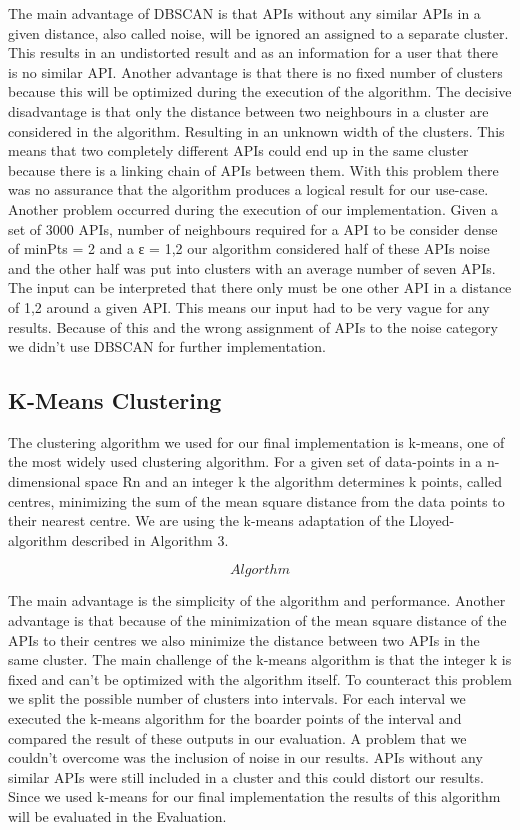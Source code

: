 \documentclass[a4paper]{IEEEtran}
\begin{document}
The main advantage of DBSCAN is that APIs without any similar APIs in a given distance, also called noise, will be ignored an assigned to a separate cluster. This results in an undistorted result and as an information for a user that there is no similar API. 
Another advantage is that there is no fixed number of clusters because this will be optimized during the execution of the algorithm.
The decisive disadvantage is that only the distance between two neighbours in a cluster are considered in the algorithm. Resulting in an unknown width of the clusters. This means that two completely different APIs could end up in the same cluster because there is a linking chain of APIs between them. With this problem there was no assurance that the algorithm produces a logical result for our use-case.
Another problem occurred during the execution of our implementation. Given a set of 3000 APIs, number of neighbours required for a API to be consider dense of minPts = 2 and a ε = 1,2 our algorithm considered half of these APIs noise and the other half was put into clusters with an average number of seven APIs. The input can be interpreted that there only must be one other API in a distance of 1,2 around a given API. This means our input had to be very vague for any results. Because of this and the wrong assignment of APIs to the noise category we didn’t use DBSCAN for further implementation.


\subsection{K-Means Clustering}
The clustering algorithm we used for our final implementation is k-means, one of the most widely used clustering algorithm. For a given set of data-points in a n-dimensional space Rn and an integer k the algorithm determines k points, called centres, minimizing the sum of the mean square distance from the data points to their nearest centre. We are using the k-means adaptation of the Lloyed-algorithm described in Algorithm 3.

\begin{equation*}
Algorthm
\end{equation*}

The main advantage is the simplicity of the algorithm and performance. Another advantage is that because of the minimization of the mean square distance of the APIs to their centres we also minimize the distance between two APIs in the same cluster.
The main challenge of the k-means algorithm is that the integer k is fixed and can’t be optimized with the algorithm itself. To counteract this problem we split the possible number of clusters into intervals. For each interval we executed the k-means algorithm for the boarder points of the interval and compared the result of these outputs in our evaluation.
A problem that we couldn’t overcome was the inclusion of noise in our results. APIs without any similar APIs were still included in a cluster and this could distort our results.
Since we used k-means for our final implementation the results of this algorithm will be evaluated in the Evaluation.
\end{document}
